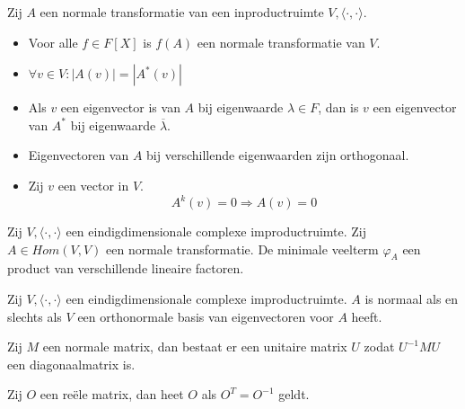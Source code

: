 \documentclass[main.tex]{subfiles}
\begin{document}
\begin{lem}
  Zij $A$ een normale transformatie van een inproductruimte $V,\langle\cdot,\cdot\rangle$.
  \begin{itemize}
  \item Voor alle $f\in F[X]$ is $f(A)$ een normale transformatie van $V$.
  \item $\forall v\in V: |A(v)| = |A^{*}(v)|$
  \item Als $v$ een eigenvector is van $A$ bij eigenwaarde $\lambda \in F$, dan is $v$ een eigenvector van $A^{*}$ bij eigenwaarde $\overline{\lambda}$. 
  \item Eigenvectoren van $A$ bij verschillende eigenwaarden zijn orthogonaal.
  \item Zij $v$ een vector in $V$.
    \[ A^{k}(v) = 0 \Rightarrow A(v) = 0 \]
  \end{itemize}
\end{lem}

\begin{lem}
  Zij $V,\langle\cdot,\cdot\rangle$ een eindigdimensionale complexe improductruimte.
  Zij $A\in Hom(V,V)$ een normale transformatie.
  De minimale veelterm $\varphi_{A}$ een product van verschillende lineaire factoren.
\end{lem}

\begin{st}
  Zij $V,\langle\cdot,\cdot\rangle$ een eindigdimensionale complexe improductruimte.
  $A$ is normaal als en slechts als $V$ een orthonormale basis van eigenvectoren voor $A$ heeft.
\end{st}

\begin{gev}
  Zij $M$ een normale matrix, dan bestaat er een unitaire matrix $U$ zodat $U^{-1}MU$ een diagonaalmatrix is.
\end{gev}

\begin{de}
  Zij $O$ een re\"ele matrix, dan heet $O$  als $O^{T}= O^{-1}$ geldt.
\end{de}
\end{document}
